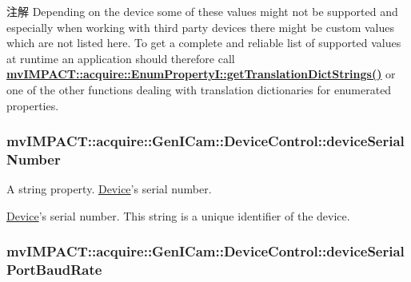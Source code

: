 \begin{DoxyNote}{注解}
Depending on the device some of these values might not be supported and especially when working with third party devices there might be custom values which are not listed here. To get a complete and reliable list of supported values at runtime an application should therefore call {\bfseries \hyperlink{classmv_i_m_p_a_c_t_1_1acquire_1_1_enum_property_i_a0ba6ccbf5ee69784d5d0b537924d26b6}{mv\+I\+M\+P\+A\+C\+T\+::acquire\+::\+Enum\+Property\+I\+::get\+Translation\+Dict\+Strings()}} or one of the other functions dealing with translation dictionaries for enumerated properties. 
\end{DoxyNote}
\hypertarget{classmv_i_m_p_a_c_t_1_1acquire_1_1_gen_i_cam_1_1_device_control_ad310abaa033e92efb1cd1d6fa8f67444}{
\subsubsection[{device\+Serial\+Number}]{ mv\+I\+M\+P\+A\+C\+T\+::acquire\+::\+Gen\+I\+Cam\+::\+Device\+Control\+::device\+Serial\+Number}}\label{classmv_i_m_p_a_c_t_1_1acquire_1_1_gen_i_cam_1_1_device_control_ad310abaa033e92efb1cd1d6fa8f67444}


A string property. \hyperlink{classmv_i_m_p_a_c_t_1_1acquire_1_1_device}{Device}'s serial number. 

\hyperlink{classmv_i_m_p_a_c_t_1_1acquire_1_1_device}{Device}'s serial number. This string is a unique identifier of the device. \hypertarget{classmv_i_m_p_a_c_t_1_1acquire_1_1_gen_i_cam_1_1_device_control_a690a42781160cda6d9862185868a27ec}{
\subsubsection[{device\+Serial\+Port\+Baud\+Rate}]{ mv\+I\+M\+P\+A\+C\+T\+::acquire\+::\+Gen\+I\+Cam\+::\+Device\+Control\+::device\+Serial\+Port\+Baud\+Rate}}\label{classmv_i_m_p_a_c_t_1_1acquire_1_1_gen_i_cam_1_1_device_control_a690a42781160cda6d9862185868a27ec}


